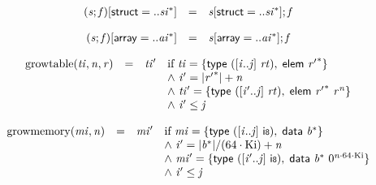 $$
\begin{array}{@{}lcl@{}l@{}}
({\mathit{s}} ; {\mathit{f}})[\mathsf{struct} = ..{{\mathit{si}}^\ast}] &=& {\mathit{s}}[\mathsf{struct} = ..{{\mathit{si}}^\ast}] ; {\mathit{f}} &  \\
\end{array}
$$

$$
\begin{array}{@{}lcl@{}l@{}}
({\mathit{s}} ; {\mathit{f}})[\mathsf{array} = ..{{\mathit{ai}}^\ast}] &=& {\mathit{s}}[\mathsf{array} = ..{{\mathit{ai}}^\ast}] ; {\mathit{f}} &  \\
\end{array}
$$

\vspace{1ex}

$$
\begin{array}{@{}lcl@{}l@{}}
{\mathrm{growtable}}({\mathit{ti}}, {\mathit{n}}, {\mathit{r}}) &=& {\mathit{ti}'} &\quad
  \mbox{if}~{\mathit{ti}} = \{ \begin{array}[t]{@{}l@{}}
\mathsf{type}~([{\mathit{i}} .. {\mathit{j}}]~{\mathit{rt}}),\; \mathsf{elem}~{{\mathit{r}'}^\ast} \}\end{array} \\
 &&&\quad {\land}~{\mathit{i}'} = {|{{\mathit{r}'}^\ast}|} + {\mathit{n}} \\
 &&&\quad {\land}~{\mathit{ti}'} = \{ \begin{array}[t]{@{}l@{}}
\mathsf{type}~([{\mathit{i}'} .. {\mathit{j}}]~{\mathit{rt}}),\; \mathsf{elem}~{{\mathit{r}'}^\ast}~{{\mathit{r}}^{{\mathit{n}}}} \}\end{array} \\
 &&&\quad {\land}~{\mathit{i}'} \leq {\mathit{j}} \\
\end{array}
$$

$$
\begin{array}{@{}lcl@{}l@{}}
{\mathrm{growmemory}}({\mathit{mi}}, {\mathit{n}}) &=& {\mathit{mi}'} &\quad
  \mbox{if}~{\mathit{mi}} = \{ \begin{array}[t]{@{}l@{}}
\mathsf{type}~([{\mathit{i}} .. {\mathit{j}}]~\mathsf{i{\scriptstyle8}}),\; \mathsf{data}~{{\mathit{b}}^\ast} \}\end{array} \\
 &&&\quad {\land}~{\mathit{i}'} = {|{{\mathit{b}}^\ast}|} / (64 \cdot {\mathrm{Ki}}) + {\mathit{n}} \\
 &&&\quad {\land}~{\mathit{mi}'} = \{ \begin{array}[t]{@{}l@{}}
\mathsf{type}~([{\mathit{i}'} .. {\mathit{j}}]~\mathsf{i{\scriptstyle8}}),\; \mathsf{data}~{{\mathit{b}}^\ast}~{0^{{\mathit{n}} \cdot 64 \cdot {\mathrm{Ki}}}} \}\end{array} \\
 &&&\quad {\land}~{\mathit{i}'} \leq {\mathit{j}} \\
\end{array}
$$

